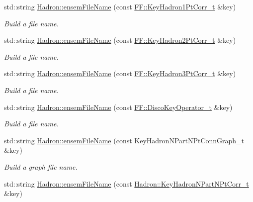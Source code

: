 \begin{DoxyCompactItemize}
\item 
std\+::string \mbox{\hyperlink{namespaceHadron_af97a705730e771598736c0ddcec48fea}{Hadron\+::ensem\+File\+Name}} (const \mbox{\hyperlink{structFF_1_1KeyHadron1PtCorr__t}{F\+F\+::\+Key\+Hadron1\+Pt\+Corr\+\_\+t}} \&key)
\begin{DoxyCompactList}\small\item\em Build a file name. \end{DoxyCompactList}\item 
std\+::string \mbox{\hyperlink{namespaceHadron_a031dddf6856dd71ac8114cf9c4106268}{Hadron\+::ensem\+File\+Name}} (const \mbox{\hyperlink{structFF_1_1KeyHadron2PtCorr__t}{F\+F\+::\+Key\+Hadron2\+Pt\+Corr\+\_\+t}} \&key)
\begin{DoxyCompactList}\small\item\em Build a file name. \end{DoxyCompactList}\item 
std\+::string \mbox{\hyperlink{namespaceHadron_a1043f4c7b4a30f750e2484e69ff0a25b}{Hadron\+::ensem\+File\+Name}} (const \mbox{\hyperlink{structFF_1_1KeyHadron3PtCorr__t}{F\+F\+::\+Key\+Hadron3\+Pt\+Corr\+\_\+t}} \&key)
\begin{DoxyCompactList}\small\item\em Build a file name. \end{DoxyCompactList}\item 
std\+::string \mbox{\hyperlink{namespaceHadron_ae52edd7538c484e9f1c59f65a1d010ca}{Hadron\+::ensem\+File\+Name}} (const \mbox{\hyperlink{structFF_1_1DiscoKeyOperator__t}{F\+F\+::\+Disco\+Key\+Operator\+\_\+t}} \&key)
\begin{DoxyCompactList}\small\item\em Build a file name. \end{DoxyCompactList}\item 
std\+::string \mbox{\hyperlink{namespaceHadron_a427c61121d387abc689b090161709921}{Hadron\+::ensem\+File\+Name}} (const Key\+Hadron\+N\+Part\+N\+Pt\+Conn\+Graph\+\_\+t \&key)
\begin{DoxyCompactList}\small\item\em Build a graph file name. \end{DoxyCompactList}\item 
std\+::string \mbox{\hyperlink{namespaceHadron_a8e1d2864f30c4b930840948366f8f356}{Hadron\+::ensem\+File\+Name}} (const \mbox{\hyperlink{structHadron_1_1KeyHadronNPartNPtCorr__t}{Hadron\+::\+Key\+Hadron\+N\+Part\+N\+Pt\+Corr\+\_\+t}} \&key)

\end{DoxyCompactItemize}
